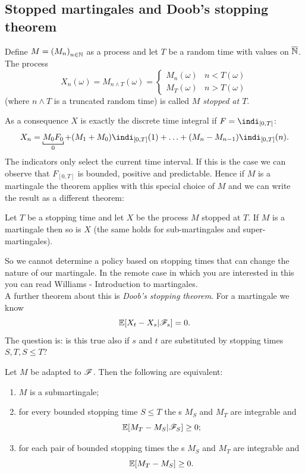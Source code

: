 \documentclass{report}
\begin{document}
\subsection{Stopped martingales and Doob's stopping theorem}
\begin{definition}
	Define $M={(M_{n})}_{n\in\mathbb{N}}$ as a process and let $T$ be a random time with values on $\overline{\mathbb{N}}$. The process
	\[X_{n}(\omega)=M_{n\wedge T}(\omega)=\begin{cases}
		M_{n}(\omega)&n<T(\omega)\\
		M_{T}(\omega)&n>T(\omega)
	\end{cases}\]
	(where $n\wedge T$ is a truncated random time) is called \emph{$M$ stopped at $T$}.
\end{definition}
As a consequence $X$ is exactly the discrete time integral if $F=\indi_{[0,T]}$:
\begin{equation*}
	X_{n}=\underbracket[0.6pt]{M_0F_0}_{0}+(M_{1}+M_{0})\indi_{[0,T]}(1)+\ldots+(M_{n}-M_{n-1})\indi_{[0,T]}(n).
\end{equation*}
The indicators only select the current time interval. If this is the case we can observe that $F_{[0,T]}$ is bounded, positive and predictable. Hence if $M$ is a martingale the theorem applies with this special choice of $M$ and we can write the result as a different theorem:
\begin{theorem}
	Let $T$ be a stopping time and let $X$ be the process $M$ stopped at $T$. If $M$ is a martingale then so is $X$ (the same holds for sub-martingales and super-martingales).
\end{theorem}
So we cannot determine a policy based on stopping times that can change the nature of our martingale. In the remote case in which you are interested in this you can read Williams - Introduction to martingales. \\
A further theorem about this is \emph{Doob's stopping theorem}. For a martingale we know
\[\mathbb{E}[X_{t}-X_{s}|\mathscr{F}_{s}]=0.\]
The question is: is this true also if $s$ and $t$ are substituted by stopping times $S,T,S\leq T$?
\begin{theorem}
	Let $M$ be adapted to $\mathscr{F}$. Then the following are equivalent:
	\begin{enumerate}[\circnum]
		\item $M$ is a submartingale;
		\item for every bounded stopping time $S\leq T$ the \rv s $M_{S}$ and $M_{T}$ are integrable and 
		\[\mathbb{E}[M_{T}-M_{S}|\mathscr{F}_{S}]\geq0;\]
		\item for each pair of bounded stopping times the \rv s $M_{S}$ and $M_{T}$ are integrable and 
		\[\mathbb{E}[M_{T}-M_{S}]\geq 0.\] 
	\end{enumerate}
\end{theorem}
\end{document}
